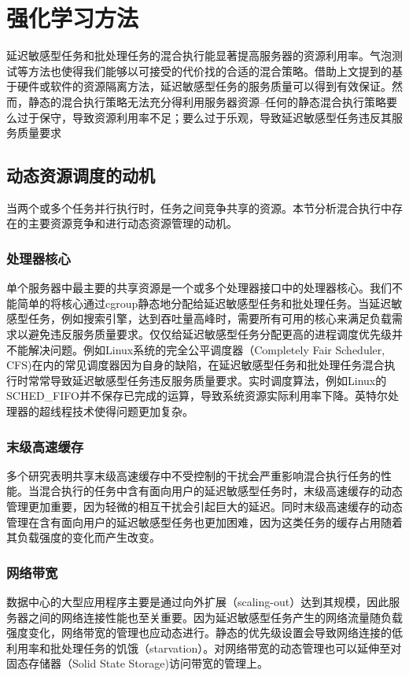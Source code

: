\chapter{强化学习方法}
延迟敏感型任务和批处理任务的混合执行能显著提高服务器的资源利用率。气泡测试等方法也使得我们能够以可接受的代价找的合适的混合策略。借助上文提到的基于硬件或软件的资源隔离方法，延迟敏感型任务的服务质量可以得到有效保证。然而，静态的混合执行策略无法充分得利用服务器资源\---任何的静态混合执行策略要么过于保守，导致资源利用率不足；要么过于乐观，导致延迟敏感型任务违反其服务质量要求\cite{lo2015heracles}
\section{动态资源调度的动机}
当两个或多个任务并行执行时，任务之间竞争共享的资源。本节分析混合执行中存在的主要资源竞争和进行动态资源管理的动机。

\subsection{处理器核心}
单个服务器中最主要的共享资源是一个或多个处理器接口中的处理器核心。我们不能简单的将核心通过cgroup静态地分配给延迟敏感型任务和批处理任务。当延迟敏感型任务，例如搜索引擎，达到吞吐量高峰时，需要所有可用的核心来满足负载需求以避免违反服务质量要求。仅仅给延迟敏感型任务分配更高的进程调度优先级并不能解决问题。例如Linux系统的完全公平调度器（Completely Fair Scheduler, CFS)在内的常见调度器因为自身的缺陷，在延迟敏感型任务和批处理任务混合执行时常常导致延迟敏感型任务违反服务质量要求\cite{leverich2014reconciling}。实时调度算法，例如Linux的SCHED\_FIFO并不保存已完成的运算，导致系统资源实际利用率下降。英特尔处理器的超线程技术使得问题更加复杂。

\subsection{末级高速缓存}
多个研究表明共享末级高速缓存中不受控制的干扰会严重影响混合执行任务的性能\cite{delimitrou2014quasar}\cite{govindan2011cuanta}\cite{leverich2014reconciling}\cite{mars2012increasing}\cite{sanchez2011vantage}。当混合执行的任务中含有面向用户的延迟敏感型任务时，末级高速缓存的动态管理更加重要，因为轻微的相互干扰会引起巨大的延迟\cite{kasture2014ubik}。同时末级高速缓存的动态管理在含有面向用户的延迟敏感型任务也更加困难，因为这类任务的缓存占用随着其负载强度的变化而产生改变\cite{leverich2014reconciling}。

\subsection{网络带宽}
数据中心的大型应用程序主要是通过向外扩展（scaling-out）达到其规模，因此服务器之间的网络连接性能也至关重要。因为延迟敏感型任务产生的网络流量随负载强度变化，网络带宽的管理也应动态进行。静态的优先级设置会导致网络连接的低利用率和批处理任务的饥饿（starvation）\cite{pattara2002starvation}。对网络带宽的动态管理也可以延伸至对固态存储器（Solid State Storage)访问带宽的管理上\cite{seong2010hydra}。

